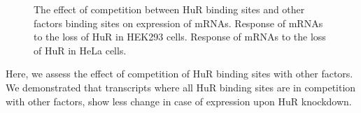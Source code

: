\clearpage
\begin{figure}[H]
	\centering
\quad
\caption[Competition effect on HuR sites]{The effect of competition between HuR binding sites and other factors binding sites on expression of mRNAs.  Response of mRNAs to the loss of HuR in HEK293 cells.  Response of mRNAs to the loss of HuR in HeLa cells.}
\label{HuR_competition}
\end{figure}

Here, we assess the effect of competition of HuR binding sites with other factors. We demonstrated that transcripts where all HuR binding sites are in competition with other factors, show less change in case of expression upon HuR knockdown.

